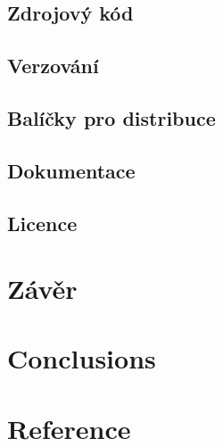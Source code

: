 \documentclass[10pt,a4paper]{article}
\begin{document}
		\subsection{Zdrojový kód}
		\subsection{Verzování}
		\subsection{Balíčky pro distribuce}
		\subsection{Dokumentace}
		\subsection{Licence}

	\section{Závěr} %
	\section{Conclusions} %
	\section{Reference} %

\end{document}

